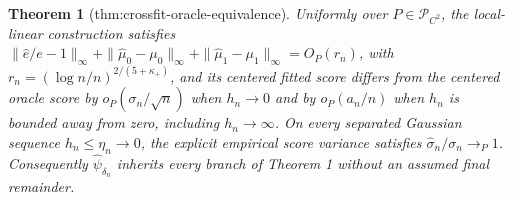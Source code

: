 \documentclass{article}
\newtheorem{theorem}{Theorem}
\begin{document}
\begin{theorem}[thm:crossfit-oracle-equivalence]\label{thm:crossfit-oracle-equivalence}
Uniformly over \(P\in\mathcal P_{C^2}\), the local-linear construction satisfies \(\|\widehat e/e-1\|_\infty+\|\widehat\mu_0-\mu_0\|_\infty+\|\widehat\mu_1-\mu_1\|_\infty=O_P(r_n)\), with \(r_n=(\log n/n)^{2/(5+\kappa_+)}\), and its centered fitted score differs from the centered oracle score by \(o_P(\sigma_n/\sqrt n)\) when \(h_n\to0\) and by \(o_P(a_n/n)\) when \(h_n\) is bounded away from zero, including \(h_n\to\infty\). On every separated Gaussian sequence \(h_n\leq\eta_n\to0\), the explicit empirical score variance satisfies \(\widehat\sigma_n/\sigma_n\to_P1\). Consequently \(\widehat\psi_{\delta_n}\) inherits every branch of Theorem 1 without an assumed final remainder.
\end{theorem}
\end{document}
